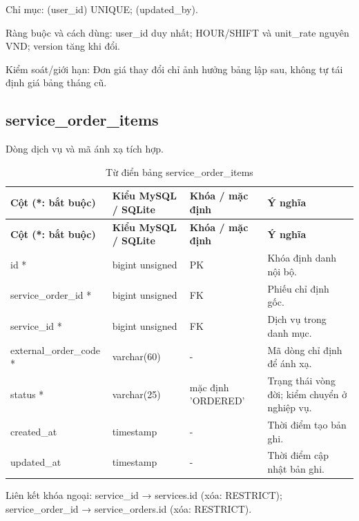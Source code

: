 Chỉ mục:\allowbreak{} (user\_\allowbreak{}id) UNIQUE; (updated\_\allowbreak{}by).\allowbreak{}

Ràng buộc và cách dùng:\allowbreak{} user\_\allowbreak{}id duy nhất; HOUR/\allowbreak{}SHIFT và unit\_\allowbreak{}rate nguyên VND; version tăng khi đổi.\allowbreak{}

Kiểm soát/\allowbreak{}giới hạn:\allowbreak{} Đơn giá thay đổi chỉ ảnh hưởng bảng lập sau, không tự tái định giá bảng tháng cũ.\allowbreak{}

\clearpage

\subsection{service\_\allowbreak{}order\_\allowbreak{}items}
Dòng dịch vụ và mã ánh xạ tích hợp.\allowbreak{}


{\fontsize{10}{12}\selectfont\setlength{\tabcolsep}{3pt}\renewcommand{\arraystretch}{1.12}
\begin{longtable}{@{}L{\textwidth-4.86pt\relax} L{\textwidth-3.96pt\relax} L{\textwidth-2.88pt\relax} L{\textwidth-6.3pt\relax}@{}}
\caption{Từ điển bảng service\_\allowbreak{}order\_\allowbreak{}items}\\
\toprule
\textbf{Cột (*:\allowbreak{} bắt buộc)} & \textbf{Kiểu My\allowbreak{}SQL /\allowbreak{} SQLite} & \textbf{Khóa /\allowbreak{} mặc định} & \textbf{Ý nghĩa}\\\midrule
\endfirsthead
\toprule
\textbf{Cột (*:\allowbreak{} bắt buộc)} & \textbf{Kiểu My\allowbreak{}SQL /\allowbreak{} SQLite} & \textbf{Khóa /\allowbreak{} mặc định} & \textbf{Ý nghĩa}\\\midrule
\endhead
\bottomrule\endlastfoot
id * & bigint unsigned & PK & Khóa định danh nội bộ.\allowbreak{}\\[1pt]
service\_\allowbreak{}order\_\allowbreak{}id * & bigint unsigned & FK & Phiếu chỉ định gốc.\allowbreak{}\\[1pt]
service\_\allowbreak{}id * & bigint unsigned & FK & Dịch vụ trong danh mục.\allowbreak{}\\[1pt]
external\_\allowbreak{}order\_\allowbreak{}code * & varchar(60) & - & Mã dòng chỉ định để ánh xạ.\allowbreak{}\\[1pt]
status * & varchar(25) & mặc định 'ORDERED' & Trạng thái vòng đời; kiểm chuyển ở nghiệp vụ.\allowbreak{}\\[1pt]
created\_\allowbreak{}at & timestamp & - & Thời điểm tạo bản ghi.\allowbreak{}\\[1pt]
updated\_\allowbreak{}at & timestamp & - & Thời điểm cập nhật bản ghi.\allowbreak{}\\[1pt]
\end{longtable}}
Liên kết khóa ngoại:\allowbreak{} service\_\allowbreak{}id → services.\allowbreak{}id (xóa:\allowbreak{} RESTRICT); service\_\allowbreak{}order\_\allowbreak{}id → service\_\allowbreak{}orders.\allowbreak{}id (xóa:\allowbreak{} RESTRICT).\allowbreak{}


